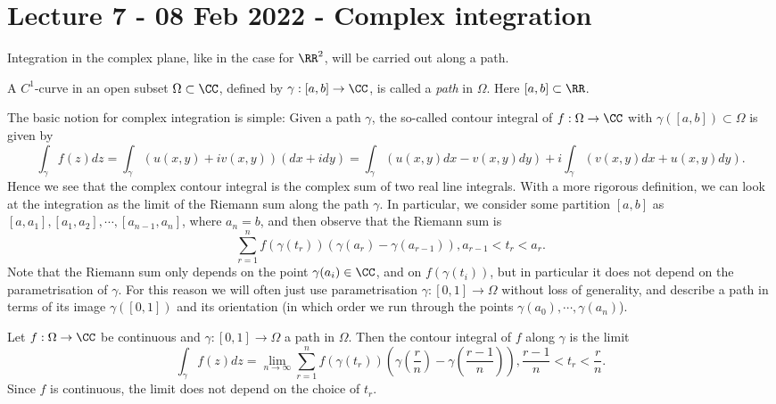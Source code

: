 \section{Lecture 7 - 08 Feb 2022 - Complex integration}
Integration in the complex plane, like in the case for $\RR^2$, will be carried
out along a path.
\begin{definition}
  A $C^1$-curve in an open subset $\Omega\subset\CC$, defined by
  $\gamma:[a,b]\to\CC$, is called a \emph{path} in $\Omega$. Here
  $[a,b]\subset\RR$.
\end{definition}
The basic notion for complex integration is simple: Given a path $\gamma$, the
so-called contour integral of $f:\Omega\to\CC$ with $\gamma([a,b])\subset\Omega$
is given by
\[\int_{\gamma} f(z)dz = \int_{\gamma} (u(x,y)+iv(x,y)) (dx+i dy) =
\int_{\gamma}(u(x,y)dx - v(x,y)dy) + i\int_{\gamma}(v(x,y)dx + u(x,y) dy).\]
Hence we see that the complex contour integral is the complex sum of two real
line integrals. With a more rigorous definition, we can look at the integration
as the limit of the Riemann sum along the path $\gamma$. In particular, we
consider some partition $[a,b]$ as $[a,a_1],[a_1,a_2],\cdots,[a_{n-1},a_n]$,
where $a_n=b$, and then observe that the Riemann sum is 
\[\sum_{r=1}^n f(\gamma(t_r)) (\gamma(a_r) - \gamma(a_{r-1})), a_{r-1}< t_r<
a_r.\]
Note that the Riemann sum only depends on the point $\gamma(a_i)\in\CC$, and on
$f(\gamma(t_i))$, but in particular it does not depend on the parametrisation of
$\gamma$. For this reason we will often just use parametrisation
$\gamma:[0,1]\to\Omega$ without loss of generality, and describe a path in terms
of its image $\gamma([0,1])$ and its orientation (in which order we run through
the points $\gamma(a_0),\cdots, \gamma(a_n)$).
\begin{definition}
  Let $f:\Omega\to\CC$ be continuous and $\gamma:[0,1]\to\Omega$ a path in
  $\Omega$. Then the contour integral of $f$ along $\gamma$ is the limit 
  \[\int_{\gamma} f(z)dz = \lim_{n\to\infty} \sum_{r=1}^{n} f(\gamma(t_r))
  (\gamma(\frac{r}{n}) - \gamma(\frac{r-1}{n})), \frac{r-1}{n}<t_r
  <\frac{r}{n}.\]
  Since $f$ is continuous, the limit does not depend on the choice of $t_r$.
  \label{<+label+>}
\end{definition}

